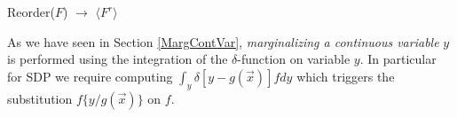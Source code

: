 \documentclass[twoside,11pt]{article}
\begin{document}
\incmargin{0.5em}
\linesnumbered
\begin{algorithm}[t!]
\dontprintsemicolon

\BlankLine
{}
\caption{{\sc Reorder}($F$) $\longrightarrow$ $\langle F^r \rangle$ \label{alg:reorder}}
\end{algorithm}
\decmargin{0.5em}

As we have seen in Section \ref{MargContVar}, \emph{marginalizing a continuous variable} $y$ is performed using the integration of the $\delta$-function on variable $y$. In particular for SDP we require computing $\int_{y} \delta [ y - g(\vec{x})]fdy$ which triggers the substitution $f \lbrace y/ g(\vec{x})\rbrace$ on $f$.
\end{document}

